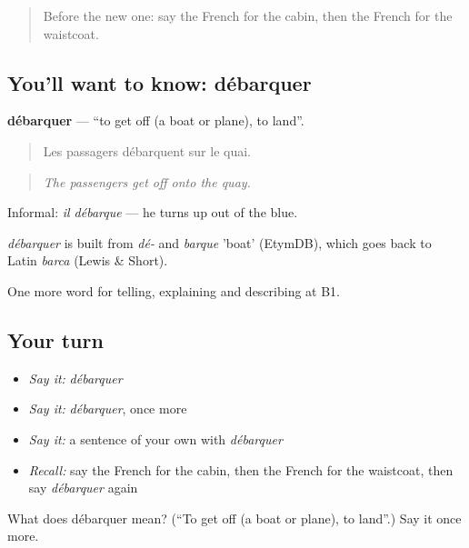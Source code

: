 \label{lesson:FR-C422-debarquer}



\begin{quote}
Before the new one: say the French for the cabin, then the French for the waistcoat.
\end{quote}

\subsection*{You'll want to know: débarquer}
\textbf{débarquer} — \textquotedblleft{}to get off (a boat or plane), to land\textquotedblright{}.

\begin{quote}
Les passagers débarquent sur le quai.
\end{quote}

\begin{quote}
\emph{The passengers get off onto the quay.}
\end{quote}

Informal: \emph{il débarque} — he turns up out of the blue.

\begin{cousinweb}
\emph{débarquer} is built from \emph{dé-} and \emph{barque} 'boat' (EtymDB), which goes back to Latin \emph{barca} (Lewis \& Short).
\end{cousinweb}

\begin{grammarlens}[title={What you've built}]
One more word for telling, explaining and describing at B1.
\end{grammarlens}

\subsection*{Your turn}
\begin{itemize}
\raggedright
  \item \emph{Say it:} \emph{débarquer}
  \item \emph{Say it:} \emph{débarquer}, once more
  \item \emph{Say it:} a sentence of your own with \emph{débarquer}
  \item \emph{Recall:} say the French for the cabin, then the French for the waistcoat, then say \emph{débarquer} again
\end{itemize}

\begin{tcolorbox}[breakable,colback=teal!4,colframe=teal!35!black,title={Before you move on}]
What does débarquer mean? (\textquotedblleft{}To get off (a boat or plane), to land\textquotedblright{}.) Say it once more.
\end{tcolorbox}
